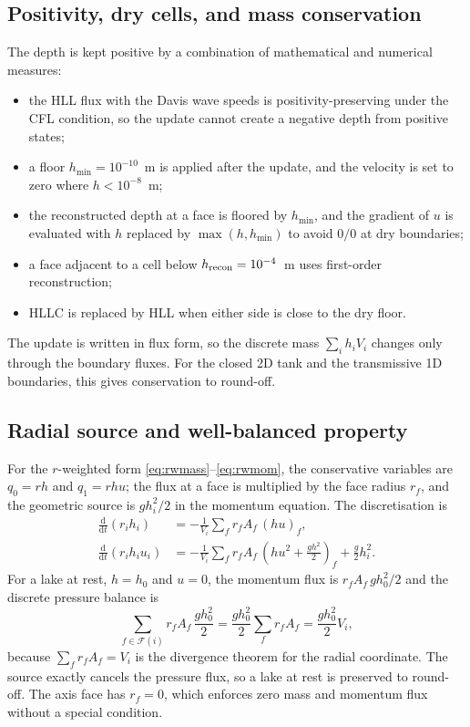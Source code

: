 ﻿\documentclass[11pt,a4paper]{article}
\begin{document}
\subsection{Positivity, dry cells, and mass conservation}
The depth is kept positive by a combination of mathematical and numerical
measures:
\begin{itemize}[leftmargin=1.4em,itemsep=1pt,topsep=2pt]
\item the HLL flux with the Davis wave speeds is positivity-preserving under
      the CFL condition, so the update cannot create a negative depth from
      positive states;
\item a floor $h_{\min}=10^{-10}$~m is applied after the update, and the
      velocity is set to zero where $h<10^{-8}$~m;
\item the reconstructed depth at a face is floored by $h_{\min}$, and the
      gradient of $u$ is evaluated with $h$ replaced by
      $\max(h,h_{\min})$ to avoid $0/0$ at dry boundaries;
\item a face adjacent to a cell below $h_{\rm recon}=10^{-4}$~m uses
      first-order reconstruction;
\item HLLC is replaced by HLL when either side is close to the dry floor.
\end{itemize}
The update is written in flux form, so the discrete mass
$\sum_i h_iV_i$ changes only through the boundary fluxes.  For the closed
2D tank and the transmissive 1D boundaries, this gives conservation to
round-off.

\subsection{Radial source and well-balanced property}
For the $r$-weighted form \eqref{eq:rwmass}--\eqref{eq:rwmom}, the conservative
variables are $q_0=rh$ and $q_1=rhu$; the flux at a face is multiplied by the
face radius $r_f$, and the geometric source is $g h_i^2/2$ in the momentum
equation.  The discretisation is
\begin{align}
  \frac{\mathrm{d}}{\mathrm{d}t}(r_i h_i)
  &=-\frac{1}{V_i}\sum_f r_f A_f\,(h u)_f,\\
  \frac{\mathrm{d}}{\mathrm{d}t}(r_i h_i u_i)
  &=-\frac{1}{V_i}\sum_f r_f A_f\,
    \left(h u^2+\frac{g h^2}{2}\right)_f
    +\frac{g}{2}h_i^2 .
  \label{eq:raddisc}
\end{align}
For a lake at rest, $h=h_0$ and $u=0$, the momentum flux is
$r_f A_f\,g h_0^2/2$ and the discrete pressure balance is
\begin{equation}
  \sum_{f\in\mathcal{F}(i)} r_f A_f\,\frac{g h_0^2}{2}
  =\frac{g h_0^2}{2}\sum_{f}r_f A_f
  =\frac{g h_0^2}{2}V_i,
  \label{eq:lake}
\end{equation}
because $\sum_f r_f A_f=V_i$ is the divergence theorem for the radial
coordinate.  The source exactly cancels the pressure flux, so a lake at rest
is preserved to round-off.  The axis face has $r_f=0$, which enforces zero
mass and momentum flux without a special condition.
\end{document}
